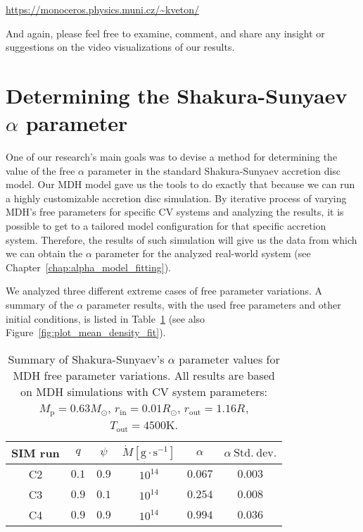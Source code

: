     \begin{center}
        \url{https://monoceros.physics.muni.cz/\~kveton/} 
    \end{center}

    And again, please feel free to examine, comment, and share any insight or suggestions on the video visualizations of our results. 

\section{Determining the Shakura-Sunyaev $\alpha$ parameter}
    One of our research's main goals was to devise a method for determining the value of the free $\alpha$ parameter in the standard Shakura-Sunyaev accretion disc model. Our MDH model gave us the tools to do exactly that because we can run a highly customizable accretion disc simulation. By iterative process of varying MDH's free parameters for specific CV systems and analyzing the results, it is possible to get to a tailored model configuration for that specific accretion system. Therefore, the results of such simulation will give us the data from which we can obtain the $\alpha$ parameter for the analyzed real-world system (see Chapter~\ref{chap:alpha_model_fitting}).

    We analyzed three different extreme cases of free parameter variations. A summary of the $\alpha$ parameter results, with the used free parameters and other initial conditions, is listed in Table~\ref{tab:table_alpha_summary} (see also Figure~\ref{fig:plot_mean_density_fit}).
    
    \begin{table}[ht]
    \centering
    \begin{tabular*}{\columnwidth}{@{\extracolsep{\fill}}cccccc}
        SIM run & $q$ & $\psi$ & $\dot{M} [\si{\gram \cdot \second^{-1}}]$ & $\alpha$ & $\alpha\ \mathrm{Std.\ dev.}$ \\ 
    \hline\hline
        C2 & $0.1$ & $0.9$ & $10^{14}$ & $0.067$ & $0.003$ \\
        C3 & $0.9$ & $0.1$ & $10^{14}$ & $0.254$ & $0.008$ \\
        C4 & $0.9$ & $0.9$ & $10^{14}$ & $0.994$ & $0.036$ \\
    \hline
    \end{tabular*}
        \caption{Summary of Shakura-Sunyaev's $\alpha$ parameter values for MDH free parameter variations. All results are based on MDH simulations with CV system parameters: $M_{\mathrm{p}} = 0.63 M_{\odot}$, $r_{\mathrm{in}} = 0.01 R_{\odot}$, $r_{\mathrm{out}} = 1.16 R_{}$, $T_{\mathrm{out}} = 4500 \si{\kelvin}$.}
    \label{tab:table_alpha_summary}
    \end{table}

